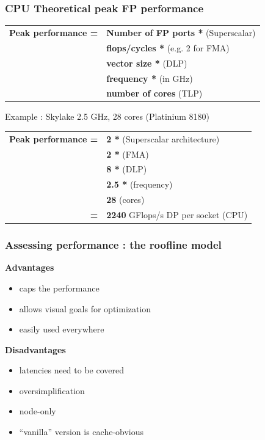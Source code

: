 \begin{frame}[containsverbatim]
\frametitle{CPU Theoretical peak FP performance }
\begin{tabular}{ r l }
\textbf{Peak performance = } & \textbf{Number of FP ports *} (Superscalar)  \\
& \textbf{flops/cycles *}  (e.g. 2 for FMA) \\
& \textbf{vector size *} (DLP) \\
& \textbf{frequency *} (in GHz) \\
& \textbf{number of cores} (TLP) \\
\end{tabular}
\vfill
Example : Skylake 2.5 GHz, 28 cores (Platinium 8180)
\begin{tabular}{ r l }
\textbf{Peak performance = } & \textbf{2 *} (Superscalar architecture)  \\
& \textbf{2 *}  (FMA) \\
& \textbf{8 *} (DLP) \\
& \textbf{2.5 *} (frequency) \\
& \textbf{28} (cores) \\
\textbf{=}&\textbf{2240} GFlops/s DP per socket (CPU) \\
\end{tabular}
\end{frame}


\begin{frame}[containsverbatim]
\frametitle{Assessing performance : the roofline model}
\textbf{Advantages}
\begin{itemize}
\item caps the performance
\item allows visual goals for optimization 
\item easily used everywhere 
\end{itemize}
\vfill
\textbf{Disadvantages}
\begin{itemize}
\item latencies need to be covered
\item oversimplification
\item node-only
\item ``vanilla'' version is cache-obvious
\end{itemize}
\end{frame}


